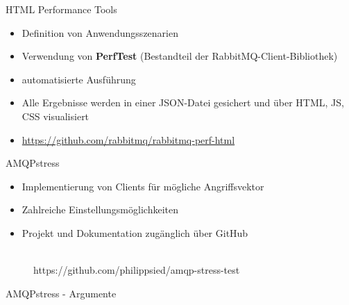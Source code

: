 \documentclass[10pt]{beamer}
\begin{document}

\begin{frame}{HTML Performance Tools}
	\begin{itemize}
		\item Definition von Anwendungsszenarien
		\item Verwendung von \textbf{PerfTest} (Bestandteil der RabbitMQ-Client-Bibliothek)
		\item automatisierte Ausführung
		\item Alle Ergebnisse werden in einer JSON-Datei gesichert und über HTML, JS, CSS visualisiert
		\item \url{https://github.com/rabbitmq/rabbitmq-perf-html}
	\end{itemize}
\end{frame}



\begin{frame}{AMQPstress}
	\centering
	\begin{itemize}
		\item Implementierung von Clients für mögliche Angriffsvektor
		\item Zahlreiche Einstellungsmöglichkeiten
		\item Projekt und Dokumentation zugänglich über GitHub
	\end{itemize}
  
	\begin{figure}[!htb]
	\centering
		\\[0.2cm] https://github.com/philippsied/amqp-stress-test
	\label{fig1}
	\end{figure}
\end{frame}

\begin{frame}[t]{AMQPstress - Argumente}
	\begin{alltt}
		\tiny
		
	\end{alltt}
\end{frame}
\end{document}
